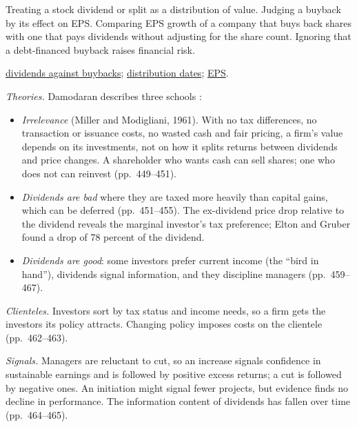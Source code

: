 \begin{qfmethod}
 Treating a stock dividend or split as a distribution of value. Judging a buyback by its effect on EPS. Comparing EPS growth of a company that buys back shares with one that pays dividends without adjusting for the share count. Ignoring that a debt-financed buyback raises financial risk.

 \hyperref[meth:payout-policy-comparison]{dividends against buybacks}; \hyperref[def:corporate-distribution-mechanics]{distribution dates}; \hyperref[meth:earnings-per-share]{EPS}.

\end{qfmethod}

\begin{qfmethod}\label{meth:dividend-policy-evaluation}
 \emph{Theories.} Damodaran describes three schools \citep[pp.~437--438, 449--452]{applied-corporate-finance-2014}:
\begin{itemize}
\item \emph{Irrelevance} (Miller and Modigliani, 1961). With no tax differences, no transaction or issuance costs, no wasted cash and fair pricing, a firm's value depends on its investments, not on how it splits returns between dividends and price changes. A shareholder who wants cash can sell shares; one who does not can reinvest (pp.~449--451).
\item \emph{Dividends are bad} where they are taxed more heavily than capital gains, which can be deferred (pp.~451--455). The ex-dividend price drop relative to the dividend reveals the marginal investor's tax preference; Elton and Gruber found a drop of 78 percent of the dividend.
\item \emph{Dividends are good}: some investors prefer current income (the ``bird in hand''), dividends signal information, and they discipline managers (pp.~459--467).
\end{itemize}

\emph{Clienteles.} Investors sort by tax status and income needs, so a firm gets the investors its policy attracts. Changing policy imposes costs on the clientele (pp.~462--463).

\emph{Signals.} Managers are reluctant to cut, so an increase signals confidence in sustainable earnings and is followed by positive excess returns; a cut is followed by negative ones. An initiation might signal fewer projects, but evidence finds no decline in performance. The information content of dividends has fallen over time (pp.~464--465).


\end{qfmethod}
